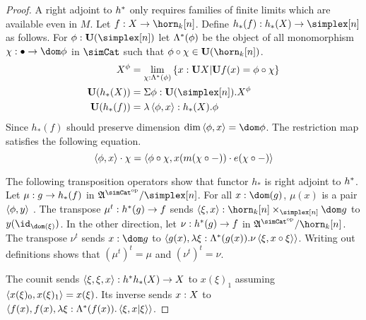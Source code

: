 \begin{proof} 
\newcommand\subs{\Lambda\ri}
A right adjoint to $h^*$ only requires families of finite limits which are available even in $M$.
Let $f\of X\to \horn_k[n]$. Define $h_*(f)\of h_*(X)\to \simplex[n]$ as follows.
For $\phi\of\base(\simplex[n])$ let $\subs(\phi)$ be the object of all monomorphism $\chi\of \bullet\to \dom \phi$ in $\simCat$ such that $\phi\circ \chi \in \base(\horn_k[n])$.
\begin{align*}
X^\phi &= \lim\limits_{\chi\of \subs(\phi)} \set{ x\of \base X | \base f(x) = \phi\circ \chi }\\
\base(h_*(X)) &= \Sigma \phi\of\base(\simplex[n]). X^\phi\\
\base(h_*(f)) &= \lambda\tuplet{\phi,x}\of h_*(X).\phi
\end{align*}
Since $h_*(f)$ should preserve dimension $\dim\tuplet{\phi,x}=\dom\phi$. The restriction map satisfies the following equation.
\[ \left\langle \phi,x \right\rangle\cdot\chi = \left\langle \phi\circ\chi,x(m(\chi\circ-))\cdot e(\chi\circ-) \right\rangle\] %

The following transposition operators show that functor $h_*$ is right adjoint to $h^*$.
Let $\mu: g\to h_*(f)$ in $\ambient\s/\simplex[n]$. For all $x\of\dom(g)$, $\mu(x)$ is a pair $\left\langle \phi,y \right\rangle$ .
The transpose $\mu^t: h^*(g) \to f$ sends $\tuplet{\xi,x}\of \horn_k[n]\times_{\simplex[n]}\dom g$ to $y(\id_{\dom(\xi)})$.
In the other direction, let $\nu: h^*(g)\to f$ in $\ambient\s/\horn_k[n]$. The transpose $\nu^t$ sends $x\of \dom g$ to $\tuplet{g(x),\lambda\xi\of\subs(g(x)).\nu\tuplet{\xi,x\circ\xi}}$. Writing out definitions shows that $(\mu^t)^t=\mu$ and $(\nu^t)^t=\nu$.

The counit sends $\left\langle \xi,\xi,x \right\rangle : h^* h_*(X)\to X$ to $x(\xi)_1$ assuming $\left\langle x(\xi)_0,x(\xi)_1 \right\rangle=x(\xi)$. Its inverse sends $x: X$ to $\tuplet{f(x),f(x),\lambda \xi\of\subs(f(x)).\tuplet{\xi,x|\xi}}$.
\end{proof}




